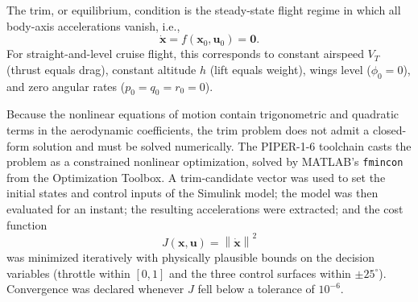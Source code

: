 \documentclass{ieeeaccess}
\begin{document}
The trim, or equilibrium, condition is the steady-state flight regime in which all body-axis accelerations vanish, i.e.,
\begin{equation}
\dot{\mathbf{x}} = f(\mathbf{x}_0, \mathbf{u}_0) = \mathbf{0}.
\label{eq:trim}
\end{equation}
For straight-and-level cruise flight, this corresponds to constant airspeed $V_T$ (thrust equals drag), constant altitude $h$ (lift equals weight), wings level ($\phi_0 = 0$), and zero angular rates ($p_0 = q_0 = r_0 = 0$).

Because the nonlinear equations of motion contain trigonometric and quadratic terms in the aerodynamic coefficients, the trim problem does not admit a closed-form solution and must be solved numerically. The PIPER-1-6 toolchain casts the problem as a constrained nonlinear optimization, solved by MATLAB's \texttt{fmincon} from the Optimization Toolbox. A trim-candidate vector was used to set the initial states and control inputs of the Simulink model; the model was then evaluated for an instant; the resulting accelerations were extracted; and the cost function
\begin{equation}
J(\mathbf{x}, \mathbf{u}) = \left\| \dot{\mathbf{x}} \right\|^2
\label{eq:trim-cost}
\end{equation}
was minimized iteratively with physically plausible bounds on the decision variables (throttle within $[0, 1]$ and the three control surfaces within $\pm 25^\circ$). Convergence was declared whenever $J$ fell below a tolerance of $10^{-6}$.
\end{document}
